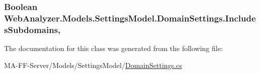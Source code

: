 \subsubsection[{Includes\+Subdomains}]{\setlength{\rightskip}{0pt plus 5cm}Boolean Web\+Analyzer.\+Models.\+Settings\+Model.\+Domain\+Settings.\+Includes\+Subdomains\hspace{0.3cm}{\ttfamily [get]}, {\ttfamily [set]}}\label{class_web_analyzer_1_1_models_1_1_settings_model_1_1_domain_settings_a55ea049e39a701dd4664daa1a53b1a92}


The documentation for this class was generated from the following file\+:\begin{DoxyCompactItemize}
\item 
M\+A-\/\+F\+F-\/\+Server/\+Models/\+Settings\+Model/\hyperlink{_domain_settings_8cs}{Domain\+Settings.\+cs}\end{DoxyCompactItemize}
